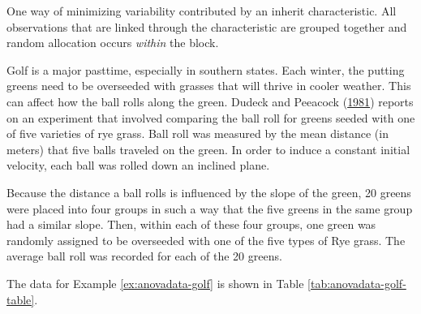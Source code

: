 \documentclass[]{book}
\theoremstyle{definition}
\theoremstyle{definition}
\theoremstyle{remark}
\let\BeginKnitrBlock\begin \let\EndKnitrBlock\end
\begin{document}
\BeginKnitrBlock{definition}[Blocking]
\protect\hypertarget{def:defn-blocking}{}{\label{def:defn-blocking}
{} }One way of minimizing variability contributed
by an inherit characteristic. All observations that are linked through
the characteristic are grouped together and random allocation occurs
\emph{within} the block.
\EndKnitrBlock{definition}

\BeginKnitrBlock{example}[Overseeding Golf Greens]
\protect\hypertarget{ex:anovadata-golf}{}{\label{ex:anovadata-golf}
{} }Golf is a major pasttime,
especially in southern states. Each winter, the putting greens need to
be overseeded with grasses that will thrive in cooler weather. This can
affect how the ball rolls along the green. Dudeck and Peeacock
(\protect\hyperlink{ref-Dudeck1981}{1981}) reports on an experiment that
involved comparing the ball roll for greens seeded with one of five
varieties of rye grass. Ball roll was measured by the mean distance (in
meters) that five balls traveled on the green. In order to induce a
constant initial velocity, each ball was rolled down an inclined plane.

Because the distance a ball rolls is influenced by the slope of the
green, 20 greens were placed into four groups in such a way that the
five greens in the same group had a similar slope. Then, within each of
these four groups, one green was randomly assigned to be overseeded with
one of the five types of Rye grass. The average ball roll was recorded
for each of the 20 greens.
\EndKnitrBlock{example}

The data for Example \ref{ex:anovadata-golf} is shown in Table
\ref{tab:anovadata-golf-table}.
\end{document}
